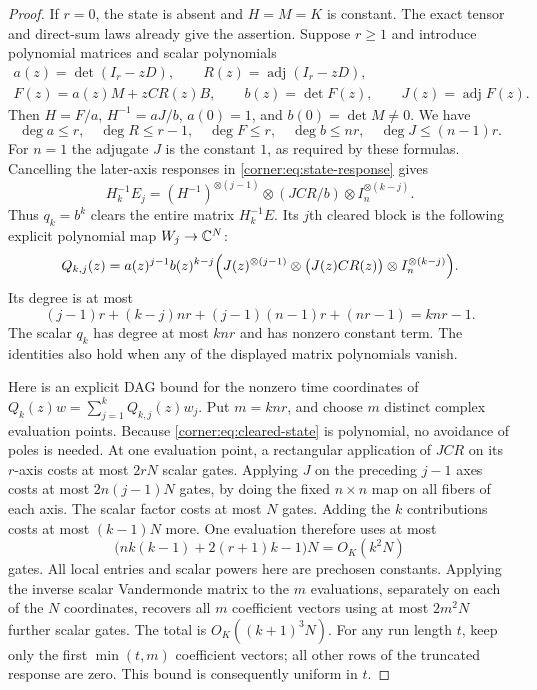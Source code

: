 \begin{proof}
If $r=0$, the state is absent and $H=M=K$ is constant.  The exact
tensor and direct-sum laws already give the assertion.  Suppose
$r\ge1$ and introduce polynomial matrices and scalar polynomials
\[
 \begin{gathered}
 a(z)=\det(I_r-zD),\qquad R(z)=\operatorname{adj}(I_r-zD),\\
 F(z)=a(z)M+zCR(z)B,\qquad
 b(z)=\det F(z),\qquad J(z)=\operatorname{adj}F(z).
 \end{gathered}
\]
Then $H=F/a$, $H^{-1}=aJ/b$, $a(0)=1$, and
$b(0)=\det M\ne0$.  We have
\[
 \deg a\le r,\quad\deg R\le r-1,\quad
 \deg F\le r,\quad\deg b\le nr,\quad\deg J\le(n-1)r.
\]
For $n=1$ the adjugate $J$ is the constant $1$, as required by
these formulas.  Cancelling the later-axis responses in
\cref{corner:eq:state-response} gives
\[
 H_k^{-1}E_j
 =(H^{-1})^{\otimes(j-1)}\otimes(JCR/b)
                         \otimes I_n^{\otimes(k-j)}.
\]
Thus $q_k=b^k$ clears the entire matrix $H_k^{-1}E$.  Its $j$th
cleared block is the following explicit polynomial map $W_j\to\mathbb C^N$:
\begin{equation}
 Q_{k,j}(z)
 =a(z)^{j-1}b(z)^{k-j}\Bigl(
    J(z)^{\otimes(j-1)}\otimes\bigl(J(z)CR(z)\bigr)
                     \otimes I_n^{\otimes(k-j)}\Bigr).
 \label{corner:eq:cleared-state}
\end{equation}
Its degree is at most
\[
 (j-1)r+(k-j)nr+(j-1)(n-1)r+(nr-1)=knr-1.
\]
The scalar $q_k$ has degree at most $knr$ and has nonzero constant
term.  The identities also hold when any of the displayed matrix
polynomials vanish.

Here is an explicit DAG bound for the nonzero time coordinates of
$Q_k(z)w=\sum_{j=1}^kQ_{k,j}(z)w_j$.  Put $m=knr$, and choose $m$
distinct complex evaluation points.  Because
\cref{corner:eq:cleared-state} is polynomial, no avoidance of poles
is needed.  At one evaluation point, a rectangular application of
$JCR$ on its $r$-axis costs at most $2rN$ scalar gates.  Applying
$J$ on the preceding $j-1$ axes costs at most $2n(j-1)N$ gates,
by doing the fixed $n\times n$ map on all fibers of each axis.
The scalar factor costs at most $N$ gates.  Adding the $k$
contributions costs at most $(k-1)N$ more.  One evaluation therefore
uses at most
\[
 \bigl(nk(k-1)+2(r+1)k-1\bigr)N=O_K(k^2N)
\]
gates.  All local entries and scalar powers here are prechosen
constants.  Applying the inverse scalar Vandermonde matrix to the
$m$ evaluations, separately on each of the $N$ coordinates, recovers
all $m$ coefficient vectors using at most $2m^2N$ further scalar
gates.  The total is $O_K((k+1)^3N)$.
For any run length $t$, keep only the first $\min(t,m)$ coefficient
vectors; all other rows of the truncated response are zero.  This
bound is consequently uniform in $t$.


\end{proof}
